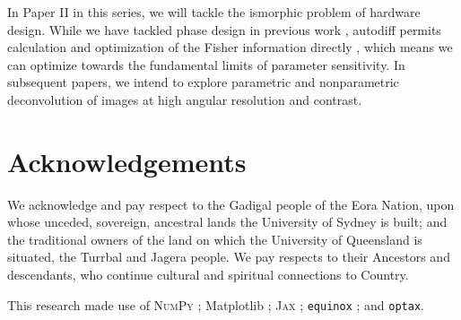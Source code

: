 \documentclass[]{spieman}
\newcommand\optax{\texttt{optax}\xspace}
\begin{document}
In Paper II in this series, we will tackle the ismorphic problem of hardware design. While we have tackled phase design in previous work \cite{phase_ret_and_design}, autodiff permits calculation and optimization of the Fisher information directly \cite{Coe2009}, which means we can optimize towards the fundamental limits of parameter sensitivity. In subsequent papers, we intend to explore parametric and nonparametric deconvolution of images at high angular resolution and contrast.


\section{Acknowledgements}

We acknowledge and pay respect to the Gadigal people of the Eora Nation, upon whose unceded, sovereign, ancestral lands the University of Sydney is built; and the traditional owners of the land on which the University of Queensland is situated, the Turrbal and Jagera people. We pay respects to their Ancestors and descendants, who continue cultural and spiritual connections to Country. 

This research made use of \textsc{NumPy} \cite{numpy}; Matplotlib \cite{matplotlib}; \textsc{Jax} \cite{jax}; \texttt{equinox} \cite{kidger2021equinox}; and \optax \cite{optax2020github}.


\end{document}
